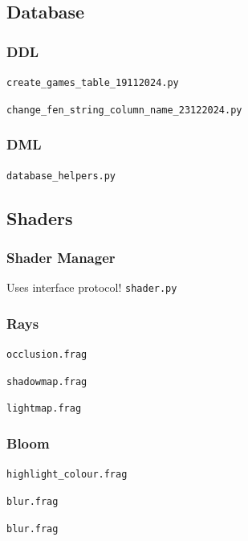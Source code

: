 \documentclass[../main/main.tex]{subfiles}
\begin{document}
\subsection{Database}
\subsubsection{DDL}
\noindent\verb|create_games_table_19112024.py|


\bigskip
\noindent\verb|change_fen_string_column_name_23122024.py|


\subsubsection{DML}
\noindent\verb|database_helpers.py|


\subsection{Shaders}
\subsubsection{Shader Manager}
Uses interface protocol!
\noindent\verb|shader.py|


\subsubsection{Rays}
\noindent\verb|occlusion.frag|


\bigskip
\noindent\verb|shadowmap.frag|


\bigskip
\noindent\verb|lightmap.frag|


\subsubsection{Bloom}
\noindent\verb|highlight_colour.frag|


\noindent\verb|blur.frag|


\bigskip
\noindent\verb|blur.frag|

\end{document}
